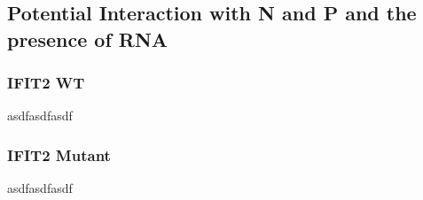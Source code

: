 \subsection{Potential Interaction with N and P and the presence of RNA}
\subsubsection{IFIT2 WT}
asdfasdfasdf

\subsubsection{IFIT2 Mutant}
asdfasdfasdf